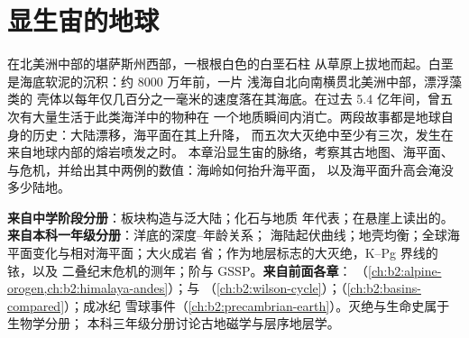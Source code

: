 \chapter{显生宙的地球}\label{ch:b2:phanerozoic-earth}

在北美洲中部的堪萨斯州西部，一根根白色的白垩石柱
从草原上拔地而起。白垩是海底软泥的沉积：约 8000 万年前，一片
浅海自北向南横贯北美洲中部，漂浮藻类的
壳体以每年仅几百分之一毫米的速度落在其海底。在过去
5.4 亿年间，曾五次有大量生活于此类海洋中的物种在
一个地质瞬间内消亡。两段故事都是地球自身的历史：大陆漂移，海平面在其上升降，
而五次大灭绝中至少有三次，发生在来自地球内部的熔岩喷发之时。
本章沿显生宙的脉络，考察其古地图、海平面、与危机，并给出其中两例的数值：海岭如何抬升海平面，
以及海平面升高会淹没多少陆地。

\begin{recall}
\textbf{来自中学阶段分册}：板块构造与泛大陆；化石与地质
年代表；在悬崖上读出的。\textbf{来自本科一年级分册}：洋底的深度–年龄关系；
海陆起伏曲线；地壳均衡；全球海平面变化与相对海平面；大火成岩
省；作为地层标志的大灭绝，K--Pg 界线的铱，以及
二叠纪末危机的测年；阶与 GSSP。\textbf{来自前面各章}：
（\cref{ch:b2:alpine-orogen,ch:b2:himalaya-andes}）；与
（\cref{ch:b2:wilson-cycle}）；（\cref{ch:b2:basins-compared}）；成冰纪
雪球事件（\cref{ch:b2:precambrian-earth}）。灭绝与生命史属于生物学分册；
本科三年级分册讨论古地磁学与层序地层学。
\end{recall}

